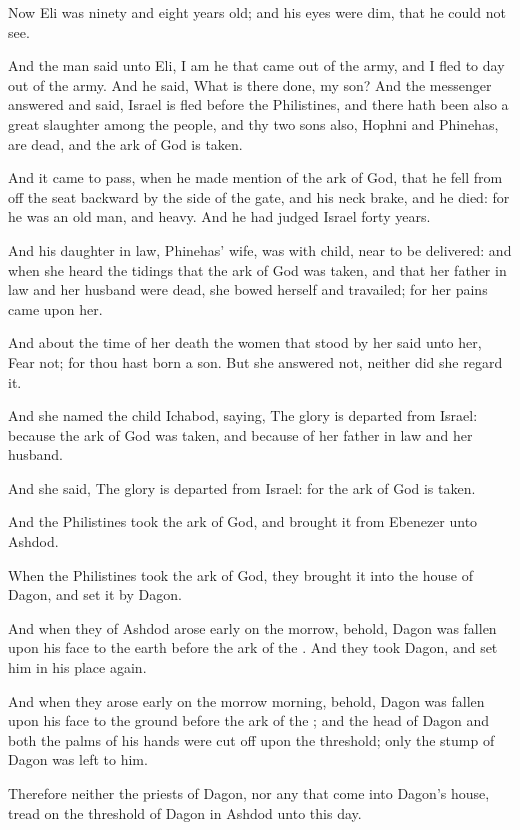 \Verse Now Eli was ninety and eight years old; and his eyes were dim, that he could not see.

\Verse And the man said unto Eli, I am he that came out of the army, and I fled to day out of the army. And he said, What is there done, my son?  \Verse And the messenger answered and said, Israel is fled before the Philistines, and there hath been also a great slaughter among the people, and thy two sons also, Hophni and Phinehas, are dead, and the ark of God is taken.

\Verse And it came to pass, when he made mention of the ark of God, that he fell from off the seat backward by the side of the gate, and his neck brake, and he died: for he was an old man, and heavy. And he had judged Israel forty years.

\Verse And his daughter in law, Phinehas' wife, was with child, near to be delivered: and when she heard the tidings that the ark of God was taken, and that her father in law and her husband were dead, she bowed herself and travailed; for her pains came upon her.

\Verse And about the time of her death the women that stood by her said unto her, Fear not; for thou hast born a son. But she answered not, neither did she regard it.

\Verse And she named the child Ichabod, saying, The glory is departed from Israel: because the ark of God was taken, and because of her father in law and her husband.

\Verse And she said, The glory is departed from Israel: for the ark of God is taken.


\Chapter
\Verse And the Philistines took the ark of God, and brought it from Ebenezer unto Ashdod.

\Verse When the Philistines took the ark of God, they brought it into the house of Dagon, and set it by Dagon.

\Verse And when they of Ashdod arose early on the morrow, behold, Dagon was fallen upon his face to the earth before the ark of the \LORD. And they took Dagon, and set him in his place again.

\Verse And when they arose early on the morrow morning, behold, Dagon was fallen upon his face to the ground before the ark of the \LORD; and the head of Dagon and both the palms of his hands were cut off upon the threshold; only the stump of Dagon was left to him.

\Verse Therefore neither the priests of Dagon, nor any that come into Dagon's house, tread on the threshold of Dagon in Ashdod unto this day.

